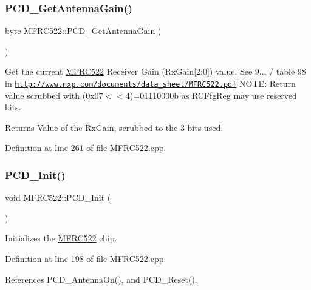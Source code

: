 \subsubsection{\texorpdfstring{P\+C\+D\+\_\+\+Get\+Antenna\+Gain()}{PCD\_GetAntennaGain()}}
{\footnotesize\ttfamily byte M\+F\+R\+C522\+::\+P\+C\+D\+\_\+\+Get\+Antenna\+Gain (\begin{DoxyParamCaption}{ }\end{DoxyParamCaption})}

Get the current \hyperlink{class_m_f_r_c522}{M\+F\+R\+C522} Receiver Gain (Rx\+Gain\mbox{[}2\+:0\mbox{]}) value. See 9... / table 98 in \href{http://www.nxp.com/documents/data_sheet/MFRC522.pdf}{\tt http\+://www.\+nxp.\+com/documents/data\+\_\+sheet/\+M\+F\+R\+C522.\+pdf} N\+O\+TE\+: Return value scrubbed with (0x07$<$$<$4)=01110000b as R\+C\+Ffg\+Reg may use reserved bits.

\begin{DoxyReturn}{Returns}
Value of the Rx\+Gain, scrubbed to the 3 bits used. 
\end{DoxyReturn}


Definition at line 261 of file M\+F\+R\+C522.\+cpp.

\mbox{\label{class_m_f_r_c522_ad681e424fc68a57941bea5702cee05eb}} 
\subsubsection{\texorpdfstring{P\+C\+D\+\_\+\+Init()}{PCD\_Init()}}
{\footnotesize\ttfamily void M\+F\+R\+C522\+::\+P\+C\+D\+\_\+\+Init (\begin{DoxyParamCaption}{ }\end{DoxyParamCaption})}

Initializes the \hyperlink{class_m_f_r_c522}{M\+F\+R\+C522} chip. 

Definition at line 198 of file M\+F\+R\+C522.\+cpp.



References P\+C\+D\+\_\+\+Antenna\+On(), and P\+C\+D\+\_\+\+Reset().

\mbox{\label{class_m_f_r_c522_a638bcf89cd6356cfbc755004a2e62b1c}} 
